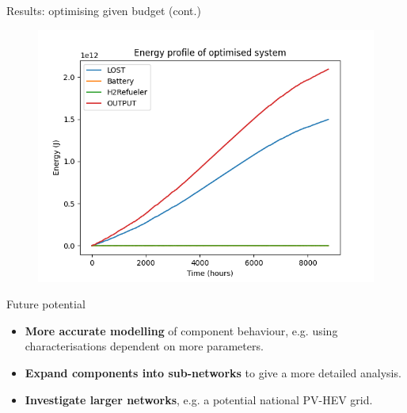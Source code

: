 \documentclass{beamer}
\begin{document}
\begin{frame}{Results: optimising given budget (cont.)}
    \begin{center}
        \begin{figure}
            \centering
            \includegraphics[width=\textwidth]{assets/opt_budget_profile.png}
        \end{figure}
    \end{center}
\end{frame}

\begin{frame}{Future potential}
    \begin{itemize}
        \item \textbf{More accurate modelling} of component behaviour, e.g. using characterisations dependent on more parameters.
        \item \textbf{Expand components into sub-networks} to give a more detailed analysis.
        \item \textbf{Investigate larger networks}, e.g. a potential national PV-HEV grid.
    \end{itemize}
\end{frame}
\end{document}
